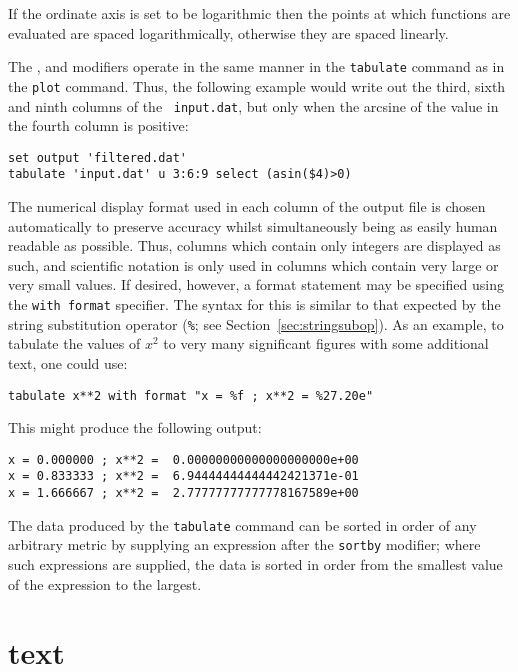 \noindent If the ordinate axis is set to be logarithmic then the points at which
functions are evaluated are spaced logarithmically, otherwise they are spaced
linearly.

The ,  and  modifiers operate in
the same manner in the {\tt tabulate} command as in the {\tt plot} command.
Thus, the following example would write out the third, sixth and ninth columns
of the \datafile\ {\tt input.dat}, but only when the arcsine of the value in the
fourth column is positive:

\begin{verbatim}
set output 'filtered.dat'
tabulate 'input.dat' u 3:6:9 select (asin($4)>0)
\end{verbatim}

The numerical display format used in each column of the output file is chosen
automatically to preserve accuracy whilst simultaneously being as easily human
readable as possible.  Thus, columns which contain only integers are displayed
as such, and scientific notation is only used in columns which contain very
large or very small values.  If desired, however, a format statement may be
specified using the {\tt with format} specifier. The syntax for this is similar
to that expected by the string substitution operator ({\tt \%}; see
Section~\ref{sec:stringsubop}). As an example, to tabulate the values of $x^2$
to very many significant figures with some additional text, one could use:

\begin{verbatim}
tabulate x**2 with format "x = %f ; x**2 = %27.20e"
\end{verbatim}

\noindent This might produce the following output:

\begin{verbatim}
x = 0.000000 ; x**2 =  0.00000000000000000000e+00
x = 0.833333 ; x**2 =  6.94444444444442421371e-01
x = 1.666667 ; x**2 =  2.77777777777778167589e+00
\end{verbatim}

The data produced by the {\tt tabulate} command can be sorted in order of any
arbitrary metric by supplying an expression after the {\tt sortby} modifier;
where such expressions are supplied, the data is sorted in order from the
smallest value of the expression to the largest.


\section{text}

